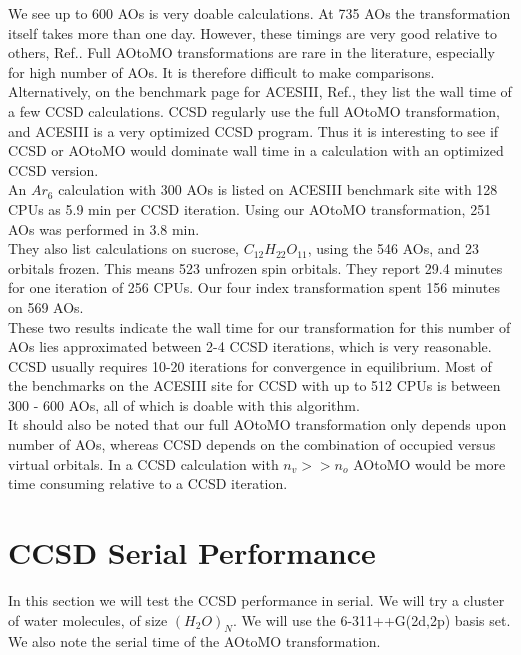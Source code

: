 \documentclass[a4paper,norsk,11pt,twoside]{report}
\begin{document}
We see up to 600 AOs is very doable calculations. At 735 AOs the transformation itself takes more than one day. However, these timings are very good relative to others, Ref.\cite{aotomo_2_cite}. Full AOtoMO transformations are rare in the literature, especially for high number of AOs. It is therefore difficult to make comparisons. \\ 

Alternatively, on the benchmark page for ACESIII, Ref.\cite{aces_non_ref}, they list the wall time of a few CCSD calculations. CCSD regularly use the full AOtoMO transformation, and ACESIII is a very optimized CCSD program. Thus it is interesting to see if CCSD or AOtoMO would dominate wall time in a calculation with an optimized CCSD version. \\

An $Ar_6$ calculation with 300 AOs is listed on ACESIII benchmark site with 128 CPUs as 5.9 min per CCSD iteration. Using our AOtoMO transformation, 251 AOs was performed in 3.8 min. \\

They also list calculations on sucrose, $C_{12} H_{22} O_{11}$, using the 546 AOs, and 23 orbitals frozen. This means 523 unfrozen spin orbitals. They report 29.4 minutes for one iteration of 256 CPUs. Our four index transformation spent 156 minutes on 569 AOs. \\

These two results indicate the wall time for our transformation for this number of AOs lies approximated between 2-4 CCSD iterations, which is very reasonable. CCSD usually requires 10-20 iterations for convergence in equilibrium. Most of the benchmarks on the ACESIII site for CCSD with up to 512 CPUs is between 300 - 600 AOs, all of which is doable with this algorithm. \\

It should also be noted that our full AOtoMO transformation only depends upon number of AOs, whereas CCSD depends on the combination of occupied versus virtual orbitals. In a CCSD calculation with $n_v >> n_o$ AOtoMO would be more time consuming relative to a CCSD iteration. 

\section{CCSD Serial Performance \label{ccsdserialperformance_ppp}}
In this section we will test the CCSD performance in serial. We will try a cluster of water molecules, of size $(H_2O)_N$. We will use the 6-311++G(2d,2p) basis set. We also note the serial time of the AOtoMO transformation. 
\end{document}
